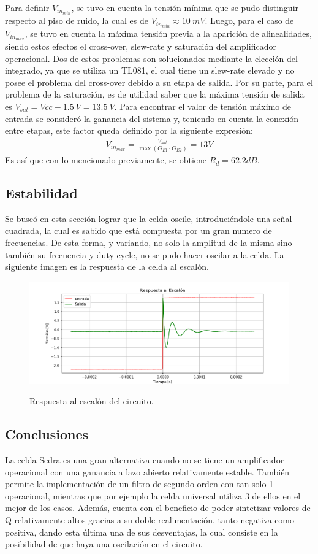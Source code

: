Para definir $V_{in_{min}}$, se tuvo en cuenta la tensión mínima que se pudo distinguir respecto al piso de ruido, la cual es de $V_{in_{min}} \approx 10 \ mV$. Luego, para el caso de $V_{in_{max}}$, se tuvo en cuenta la máxima tensión previa a la aparición de alinealidades, siendo estos efectos el cross-over, slew-rate y saturación del amplificador operacional. Dos de estos problemas son solucionados mediante la elección del integrado, ya que se utiliza un TL081, el cual tiene un slew-rate elevado y no posee el problema del cross-over debido a su etapa de salida. Por su parte, para el problema de la saturación, es de utilidad saber que la máxima tensión de salida es $V_{sat} = Vcc - 1.5 \ V = 13.5 \ V$. Para encontrar el valor de tensión máximo de entrada se consideró la ganancia del sistema y, teniendo en cuenta la conexión entre etapas, este factor queda definido por la siguiente expresión:
\begin{align}
V_{in_{max}}=\frac{V_{sat}}{  \max(G_{E1} \cdot G_{E2} )} = 13V
\end{align}
Es así que con lo mencionado previamente, se obtiene $R_d = 62.2dB$.

\subsection{Estabilidad}
Se buscó en esta sección lograr que la celda oscile, introduciéndole una señal cuadrada, la cual es sabido que está compuesta por un gran numero de frecuencias. De esta forma, y variando, no solo la amplitud de la misma sino también su frecuencia y duty-cycle, no se pudo hacer oscilar a la celda. La siguiente imagen es la respuesta de la celda al escalón.
\begin{figure}[H]
	\centering
	\includegraphics[width=\textwidth]{Imagenes-Ej3/Step.png}
	\label{fig:stepresponse}
	\caption{Respuesta al escalón del circuito.}
\end{figure}

\subsection{Conclusiones}
La celda Sedra es una gran alternativa cuando no se tiene un amplificador operacional con una ganancia a lazo abierto relativamente estable. También permite la implementación de un filtro de segundo orden con tan solo 1 operacional, mientras que por ejemplo la celda universal utiliza 3 de ellos en el mejor de los casos. Además, cuenta con el beneficio de poder sintetizar valores de Q relativamente altos gracias a su doble realimentación, tanto negativa como positiva, dando esta última una de sus desventajas, la cual consiste en la posibilidad de que haya una oscilación en el circuito.
